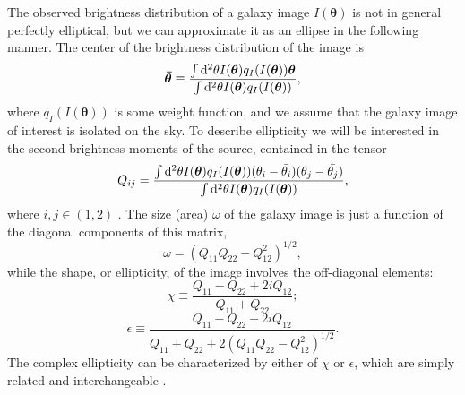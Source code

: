 The observed brightness distribution of a galaxy image $I(\bm{\theta})$ is not in general perfectly elliptical, but we can approximate it as an ellipse in the following manner. The center of the brightness distribution of the image is
\begin{equation}
\bm{\bar{\theta}} \equiv \frac{\int {\rm d}^2\theta I(\bm{\theta}) q_I( I(\bm{\theta})) \bm{\theta}}{\int {\rm d}^2\theta I(\bm{\theta}) q_I( I(\bm{\theta}))},
\end{equation}
where $q_I( I(\bm{\theta}))$ is some weight function, and we assume that the galaxy image of interest is isolated on the sky. To describe ellipticity we will be interested in the second brightness moments of the source, contained in the tensor
\begin{equation}
Q_{ij} = \frac{\int {\rm d}^2\theta I(\bm{\theta}) q_I( I(\bm{\theta})) (\theta_i - \bar{\theta_i})(\theta_j - \bar{\theta_j})}{\int {\rm d}^2\theta I(\bm{\theta}) q_I( I(\bm{\theta}))},
\end{equation}
where $i,j \in (1,2)$ \citep{Schneider06_WeakGravLens}. The size (area) $\omega$ of the galaxy image is just a function of the diagonal components of this matrix,
\begin{equation} 
\label{eqn:size}
\omega = (Q_{11}Q_{22} - Q_{12}^2)^{1/2},
\end{equation}
while the shape, or ellipticity, of the image involves the off-diagonal elements:
\begin{equation} 
\chi \equiv \frac{Q_{11} - Q_{22} + 2i Q_{12}}{Q_{11} + Q_{22}};
\end{equation}
\begin{equation} 
\epsilon \equiv \frac{Q_{11} - Q_{22} + 2i Q_{12}}{Q_{11} + Q_{22} + 2(Q_{11}Q_{22} - Q_{12}^2)^{1/2}}.
\end{equation}
The complex ellipticity can be characterized by either of $\chi$ or $\epsilon$, which are simply related and interchangeable \citep[in different situations one may be easier to work with,][]{BS01}. 

